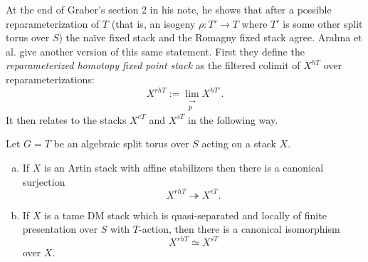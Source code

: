 \documentclass[12pt,dvipsnames]{amsart}
\begin{document}
At the end of Graber's section 2 in his note, he shows that after a possible reparameterization of \(T\) (that is, an isogeny \(\rho:T'\to T\) where \(T'\) is some other split torus over \(S\)) the na\"ive fixed stack and the Romagny fixed stack agree. Arahna et al. give another version of this same statement. First they define the \emph{reparameterized homotopy fixed point stack} as the filtered colimit of \(X^{hT}\) over reparameterizations:
\[X^{rhT} := \lim_{\substack{\to \\ p}} X^{hT'}.\]
It then relates to the stacks \(X^{eT}\) and \(X^{sT}\) in the following way.

\begin{theorem}\label{rl-001G}\label{thm:reconciliation-of-fixed-stacks-for-tori}
  Let \(G = T\) be an algebraic split torus over \(S\) acting on a stack \(X\).
  \begin{enumerate}[(a)]
    \item If \(X\) is an Artin stack with affine stabilizers then there is a canonical surjection
          \[X^{rhT}\twoheadrightarrow X^{eT}.\]
    \item If \(X\) is a tame DM stack which is quasi-separated and locally of finite presentation over \(S\) with \(T\)-action, then there is a canonical isomorphism
          \[X^{rhT} \simeq X^{sT}\]
    over \(X\).
  \end{enumerate}

\end{theorem}




\newpage

\printbibliography
\end{document}
